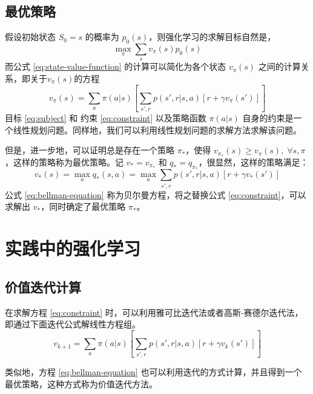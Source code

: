 \subsection{最优策略}
假设初始状态 $S_0 = s$ 的概率为 $p_0(s)$，则强化学习的求解目标自然是，
\begin{equation}
    \max_\pi \sum_s v_\pi(s) p_0(s)
    \label{eq:subject}
\end{equation}
而公式 \ref{eq:state-value-function} 的计算可以简化为各个状态 $v_\pi(s)$ 之间的计算关系，即关于$v_\pi(s)$的方程
\begin{equation}
    v_\pi (s) = \sum_a \pi(a|s) \left[ \sum_{s', r} p(s', r | s, a)  [r + \gamma v_\pi(s')] \right]
    \label{eq:constraint}
\end{equation}
目标 \ref{eq:subject} 和 约束 \ref{eq:constraint} 以及策略函数 $\pi(a|s)$ 自身的约束是一个线性规划问题。同样地，我们可以利用线性规划问题的求解方法求解该问题。

但是，进一步地，可以证明\cite{suttonReinforcementLearningIntroduction2018}总是存在一个策略 $\pi_*$，使得 $v_{\pi_*}(s) \geq v_\pi(s), \; \forall s,\pi$，这样的策略称为最优策略。记 $v_* = v_{\pi_*}$ 和 $q_* = q_{\pi_*}$，很显然，这样的策略满足：
\begin{equation}
    v_*(s) = \max_{a} q_*(s, a) = \max_a \sum_{s', r} p(s', r | s, a) \left[r + \gamma v_*(s') \right]
    \label{eq:bellman-equation}
\end{equation}
公式 \ref{eq:bellman-equation} 称为贝尔曼方程，将之替换公式 \ref{eq:constraint}，可以求解出 $v_*$，同时确定了最优策略 $\pi_*$。

\section{实践中的强化学习}
\subsection{价值迭代计算}
在求解方程 \ref{eq:constraint} 时，可以利用雅可比迭代法或者高斯-赛德尔迭代法，即通过下面迭代公式解线性方程组。
\begin{equation}
    v_{k+1} = \sum_a \pi(a|s) \left[ \sum_{s', r} p(s', r | s, a)  \left[r + \gamma v_k(s') \right] \right]
\end{equation}

类似地，方程 \ref{eq:bellman-equation} 也可以利用迭代的方式计算，并且得到一个最优策略，这种方式称为价值迭代方法。

